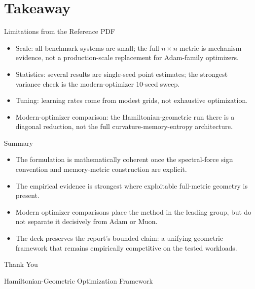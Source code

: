 ﻿\documentclass[aspectratio=169,11pt]{beamer}
\begin{document}
\section{Takeaway}

\begin{frame}{Limitations from the Reference PDF}
  \small
  \begin{itemize}
    \item Scale: all benchmark systems are small; the full $n\times n$ metric is mechanism evidence, not a production-scale replacement for Adam-family optimizers.
    \item Statistics: several results are single-seed point estimates; the strongest variance check is the modern-optimizer 10-seed sweep.
    \item Tuning: learning rates come from modest grids, not exhaustive optimization.
    \item Modern-optimizer comparison: the Hamiltonian-geometric run there is a diagonal reduction, not the full curvature-memory-entropy architecture.
  \end{itemize}
\end{frame}

\begin{frame}{Summary}
  \begin{itemize}
    \item The formulation is mathematically coherent once the spectral-force sign convention and memory-metric construction are explicit.
    \item The empirical evidence is strongest where exploitable full-metric geometry is present.
    \item Modern optimizer comparisons place the method in the leading group, but do not separate it decisively from Adam or Muon.
    \item The deck preserves the report's bounded claim: a unifying geometric framework that remains empirically competitive on the tested workloads.
  \end{itemize}
\end{frame}

\begin{frame}
  \centering
  \Huge Thank You

  \vspace{1em}
  \large Hamiltonian-Geometric Optimization Framework
\end{frame}
\end{document}
